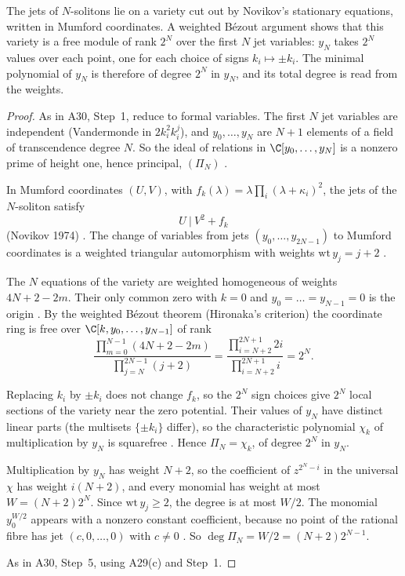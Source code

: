 \begin{proofidea}
The jets of $N$-solitons lie on a variety cut out by Novikov's stationary equations, written in Mumford coordinates. A weighted B\'ezout argument shows that this variety is a free module of rank $2^N$ over the first $N$ jet variables: $y_N$ takes $2^N$ values over each point, one for each choice of signs $k_i\mapsto\pm k_i$. The minimal polynomial of $y_N$ is therefore of degree $2^N$ in $y_N$, and its total degree is read from the weights.
\end{proofidea}

\begin{proof}
As in A30, Step~1, reduce to formal variables. The first $N$ jet variables are independent (Vandermonde in $2k_i^2k_i^j$), and $y_0,\dots,y_N$ are $N+1$ elements of a field of transcendence degree $N$. So the ideal of relations in $\C[y_0,\dots,y_N]$ is a nonzero prime of height one, hence principal, $(\Pi_N)$ .

In Mumford coordinates $(U,V)$, with $f_k(\lambda)=\lambda\prod_i(\lambda+\kappa_i)^2$, the jets of the $N$-soliton satisfy
\[
U\ \big|\ V^2+f_k
\]
(Novikov 1974) \cf. The change of variables from jets $(y_0,\dots,y_{2N-1})$ to Mumford coordinates is a weighted triangular automorphism with weights $\mathrm{wt}\,y_j=j+2$ .

The $N$ equations of the variety are weighted homogeneous of weights $4N+2-2m$. Their only common zero with $k=0$ and $y_0=\dots=y_{N-1}=0$ is the origin . By the weighted B\'ezout theorem (Hironaka's criterion) the coordinate ring is free over $\C[k,y_0,\dots,y_{N-1}]$ of rank
\[
\frac{\prod_{m=0}^{N-1}(4N+2-2m)}{\prod_{j=N}^{2N-1}(j+2)}=\frac{\prod_{i=N+2}^{2N+1}2i}{\prod_{i=N+2}^{2N+1}i}=2^N .
\]

Replacing $k_i$ by $\pm k_i$ does not change $f_k$, so the $2^N$ sign choices give $2^N$ local sections of the variety near the zero potential. Their values of $y_N$ have distinct linear parts (the multisets $\{\pm k_i\}$ differ), so the characteristic polynomial $\chi_k$ of multiplication by $y_N$ is squarefree . Hence $\Pi_N=\chi_k$, of degree $2^N$ in $y_N$.

Multiplication by $y_N$ has weight $N+2$, so the coefficient of $z^{2^N-i}$ in the universal $\chi$ has weight $i(N+2)$, and every monomial has weight at most $W=(N+2)2^N$. Since $\mathrm{wt}\,y_j\ge2$, the degree is at most $W/2$. The monomial $y_0^{W/2}$ appears with a nonzero constant coefficient, because no point of the rational fibre has jet $(c,0,\dots,0)$ with $c\ne0$ . So $\deg\Pi_N=W/2=(N+2)2^{N-1}$.

As in A30, Step~5, using A29(c) and Step~1.

\end{proof}
